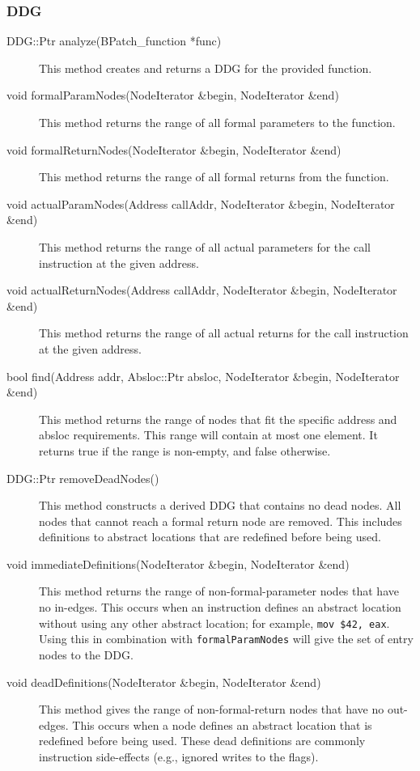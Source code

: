 \documentclass[12pt,titlepage]{article}
\begin{document}
\subsubsection{DDG}
\begin{description}
\item[DDG::Ptr analyze(BPatch\_function *func)]
This method creates and returns a DDG for the provided function.
\item[void formalParamNodes(NodeIterator \&begin, NodeIterator \&end) ]
This method returns the range of all formal parameters to the function.
\item[void formalReturnNodes(NodeIterator \&begin, NodeIterator \&end)]
This method returns the range of all formal returns from the function.
\item[void actualParamNodes(Address callAddr, NodeIterator \&begin, NodeIterator \&end) ]
This method returns the range of all actual parameters for the call instruction
at the given address.
\item[void actualReturnNodes(Address callAddr, NodeIterator \&begin, NodeIterator \&end)]
This method returns the range of all actual returns for the call instruction at
the given address.
\item[bool find(Address addr, Absloc::Ptr absloc, NodeIterator \&begin, NodeIterator \&end) ]
This method returns the range of nodes that fit the specific address
and absloc requirements. This range will contain at most one
element. It returns true if the range is non-empty, and false
otherwise. 
\item[DDG::Ptr removeDeadNodes()] This method constructs a derived DDG
  that contains no dead nodes. All nodes that cannot reach a
  formal return node are removed. This includes definitions to
  abstract locations that are redefined before being used. 
\item[void immediateDefinitions(NodeIterator \&begin, NodeIterator
  \&end)] This method returns the range of non-formal-parameter nodes
  that have no in-edges. This occurs when an instruction defines an
  abstract location without using any other abstract location; for
  example, \texttt{mov \$42, eax}. Using this in combination with
  \texttt{formalParamNodes} will give the set of entry nodes to the DDG.
\item[void deadDefinitions(NodeIterator \&begin, NodeIterator \&end)]
  This method gives the range of non-formal-return nodes that have no
  out-edges. This occurs when a node defines an abstract location that
  is redefined before being used. These dead definitions are commonly
  instruction side-effects (e.g., ignored writes to the flags). 
\end{description}
\end{document}
